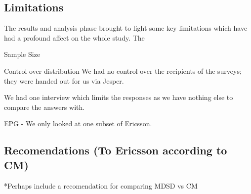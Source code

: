\documentclass[final_report_innit.tex]{subfiles}
\begin{document}
\subsection*{Limitations}

The results and analysis phase brought to light some key limitations which have had a profound affect on the whole study. The

Sample Size

Control over distribution
We had no control over the recipients of the surveys; they were handed out for us via Jesper.

We had one interview which limits the responses as we have nothing else to compare the answers with.

EPG - We only looked at one subset of Ericsson.

\subsection*{Recomendations (To Ericsson according to CM)}

*Perhaps include a recomendation for comparing MDSD vs CM
\end{document}
